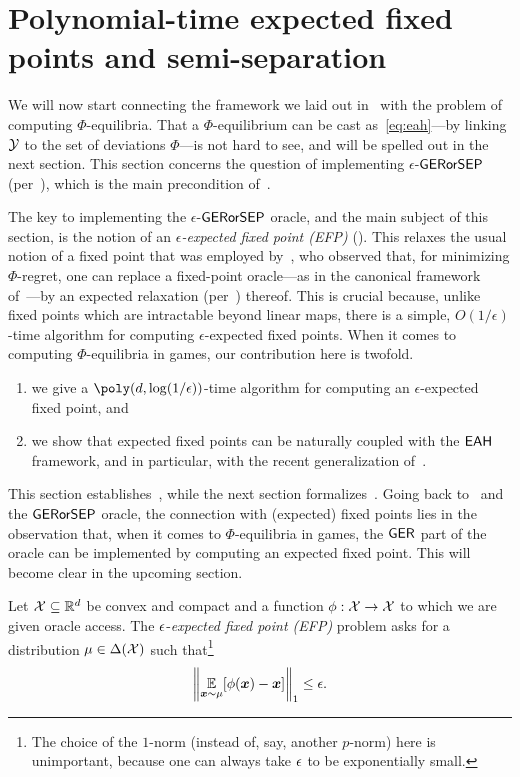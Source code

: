 \section{Polynomial-time expected fixed points and semi-separation}

We will now start connecting the framework we laid out in~ with the problem of computing $\Phi$-equilibria. That a $\Phi$-equilibrium can be cast as~\eqref{eq:eah}---by linking ${\mathcal{Y}}$ to the set of deviations $\Phi$---is not hard to see, and will be spelled out in the next section. This section concerns the question of implementing $\epsilon$-$\textsf{GERorSEP}$ (per~), which is the main precondition of~.

The key to implementing the $\epsilon$-$\textsf{GERorSEP}$ oracle, and the main subject of this section, is the notion of an \emph{$\epsilon$-expected fixed point (EFP)} (). This relaxes the usual notion of a fixed point that was employed by~\citet{Zhang24:Efficient}, who observed that, for minimizing $\Phi$-regret, one can replace a fixed-point oracle---as in the canonical framework of~\citet{Gordon08:No}---by an expected relaxation (per~) thereof. This is crucial because, unlike fixed points which are intractable beyond linear maps, there is a simple, $O(1/\epsilon)$-time algorithm for computing $\epsilon$-expected fixed points. When it comes to computing $\Phi$-equilibria in games, our contribution here is twofold.

\begin{enumerate}
    \item we give a $\poly(d, \log(1/\epsilon))$-time algorithm for computing an $\epsilon$-expected fixed point, and\label{item:fast}
    \item we show that expected fixed points can be naturally coupled with the $\textsf{EAH}$ framework, and in particular, with the recent generalization of~\citet{Daskalakis24:Efficient}.\label{item:furious}
\end{enumerate}
This section establishes~, while the next section formalizes~. Going back to~ and the $\textsf{GERorSEP}$ oracle, the connection with (expected) fixed points lies in the observation that, when it comes to $\Phi$-equilibria in games, the $\textsf{GER}$ part of the oracle can be implemented by computing an expected fixed point. This will become clear in the upcoming section.

\begin{definition}
    \label{def:EFP}
    Let ${\mathcal{X}} \subseteq \mathbb R^d$ be convex and compact and a function $\phi : {\mathcal{X}} \to {\mathcal{X}}$ to which we are given oracle access. The $\epsilon$-{\em expected fixed point (EFP)} problem asks for a distribution $\mu \in \Delta({\mathcal{X}})$ such that\footnote{The choice of the $1$-norm (instead of, say, another $p$-norm) here is unimportant, because one can always take $\epsilon$ to be exponentially small.} 
    \begin{equation}
        \label{eq:EFP}
    \norm{\operatorname*{\mathbb E}_{{\bm{x}} \sim \mu}[\phi({\bm{x}})-{\bm{x}}]}_1 \le \epsilon.
    \end{equation}
\end{definition}

